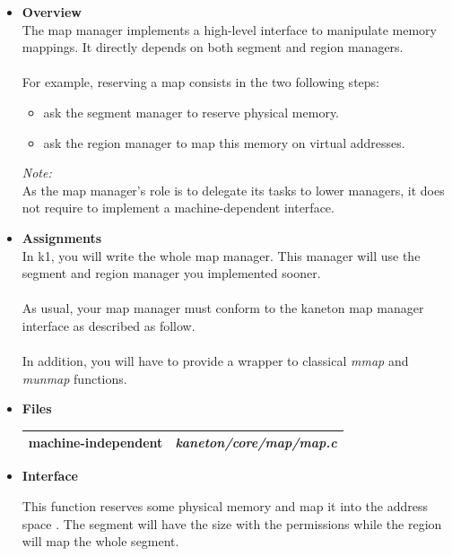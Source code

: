 \begin{itemize}
  \item {\bf Overview}\\
    The map manager implements a high-level interface to manipulate memory mappings.
    It directly depends on both segment and region managers.\\
    \\
    For example, reserving a map consists in the two following steps:
    \begin{itemize}
      \item ask the segment manager to reserve physical memory.
      \item ask the region manager to map this memory on virtual addresses.\\
    \end{itemize}

    {\em Note:}\\
    As the map manager's role is to delegate its tasks to lower managers, it does
    not require to implement a machine-dependent interface.\\

  \item {\bf Assignments}\\
    In k1, you will write the whole map manager. This manager will use the segment
    and region manager you implemented sooner.\\
    \\
    As usual, your map manager must conform to the kaneton map manager interface as
    described as follow.\\
    \\
    In addition, you will have to provide a wrapper to classical
    \emph{mmap} and \emph{munmap} functions.

  \item {\bf {Files}}\\

    \begin{tabular}{| l | l |}
      \hline
      machine-independent & {\em kaneton/core/map/map.c}\\\hline
    \end{tabular}

  \item {\bf Interface}\\

	 {
	   This function reserves some physical memory and map it into
	   the address space .  The segment will have the
	   size  with the permissions 
	   while the region will map the whole segment.

}
\end{itemize}
